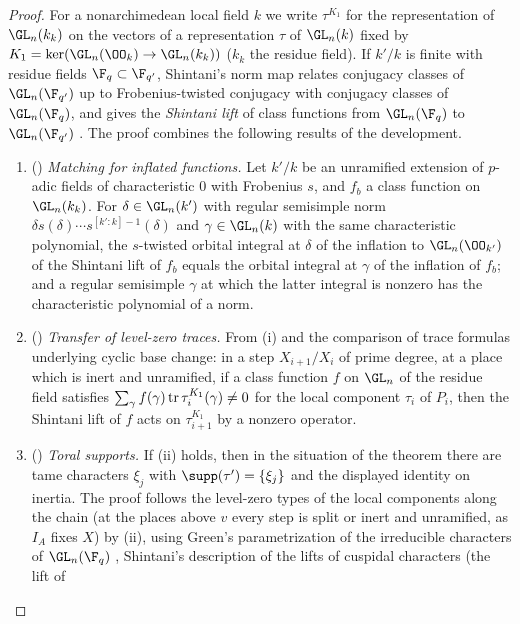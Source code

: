 \begin{proof}
For a nonarchimedean local field $k$ we write $\tau^{K_1}$ for the representation of $\GL_n(k_k)$ on the vectors of a
representation $\tau$ of $\GL_n(k)$ fixed by $K_1=\ker(\GL_n(\OO_k)\to\GL_n(k_k))$ ($k_k$ the residue field). If $k'/k$ is
finite with residue fields $\F_q\subset\F_{q'}$, Shintani's norm map relates conjugacy classes of $\GL_n(\F_{q'})$ up to
Frobenius-twisted conjugacy with conjugacy classes of $\GL_n(\F_q)$, and gives the \emph{Shintani lift} of class functions
from $\GL_n(\F_q)$ to $\GL_n(\F_{q'})$ \cite{Shintani1976}. The proof combines the following results of the development.
\begin{enumerate}[label=(\roman*),nosep]
\item () \emph{Matching for inflated functions.} Let $k'/k$ be an
  unramified extension of $p$-adic fields of characteristic $0$ with Frobenius $s$, and $f_b$ a class function on
  $\GL_n(k_k)$. For $\delta\in\GL_n(k')$ with regular semisimple norm $\delta s(\delta)\cdots s^{[k':k]-1}(\delta)$ and
  $\gamma\in\GL_n(k)$ with the same characteristic polynomial, the $s$-twisted orbital integral at $\delta$ of the
  inflation to $\GL_n(\OO_{k'})$ of the Shintani lift of $f_b$ equals the orbital integral at $\gamma$ of the inflation of
  $f_b$; and a regular semisimple $\gamma$ at which the latter integral is nonzero has the characteristic polynomial of a
  norm.
\item () \emph{Transfer of level-zero traces.} From
  (i) and the comparison of trace formulas underlying cyclic base change: in a step $X_{i+1}/X_i$ of prime degree, at a
  place which is inert and unramified, if a class function $f$ on $\GL_n$ of the residue field satisfies
  $\sum_\gamma f(\gamma)\operatorname{tr}\tau_i^{K_1}(\gamma)\ne0$ for the local component $\tau_i$ of $P_i$, then the Shintani lift
  of $f$ acts on $\tau_{i+1}^{K_1}$ by a nonzero operator.
\item () \emph{Toral supports.} If (ii) holds, then in the
  situation of the theorem there are tame characters $\xi_j$ with $\supp(\tau')=\{\xi_j\}$ and the displayed identity on
  inertia. The proof follows the level-zero types of the local components along the chain (at the places above $v$ every
  step is split or inert and unramified, as $I_A$ fixes $X$) by (ii), using Green's parametrization of the irreducible
  characters of $\GL_n(\F_q)$ \cite{Green1955}, Shintani's description of the lifts of cuspidal characters (the lift of

\end{enumerate}
\end{proof}

